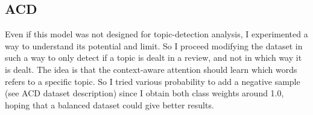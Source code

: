 \documentclass{article}
\begin{document}
        \subsection{ACD}\label{subsec:s2}
            Even if this model was not designed for topic-detection analysis, I experimented a way to understand its potential and limit.
            So I proceed modifying the dataset in such a way to only detect if a topic is dealt in a review, and not in which way it is dealt.
            The idea is that the context-aware attention should learn which words refers to a specific topic.
            So I tried various probability to add a negative sample (see ACD dataset description) since I obtain both class weights around 1.0, hoping that a balanced dataset could give better results.
\end{document}
